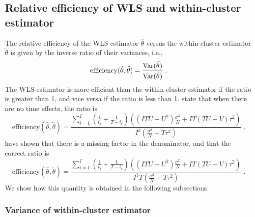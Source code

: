 \documentclass[10pt]{article}
\begin{document}
\subsection{Relative efficiency of WLS and within-cluster estimator} \label{apx:efficiency}

The relative efficiency of the WLS estimator $\hat{\theta}$ versus the within-cluster estimator $\tilde{\theta}$ is given by the inverse ratio of their variances, i.e.,
\[
\mathrm{efficiency}(\hat{\theta},\tilde{\theta}) = \frac{\mathrm{Var}(\tilde{\theta})}{\mathrm{Var}(\hat{\theta})} \;.
\]
The WLS estimator is more efficient than the within-cluster estimator if the ratio is greater than 1, and vice versa if the ratio is less than 1. \textcite{Hussey:2007} state that when there are no time effects, the ratio is
\[
\mathrm{efficiency}(\hat{\theta},\tilde{\theta}) = \frac{\sum_{i=1}^I\left(\frac{1}{t_i}+\frac{1}{T-t_i}\right)\left((ITU-U^2)\frac{\sigma^2}{N}+IT(TU-V)\tau^2\right)}{I^3\left(\frac{\sigma^2}{N}+T\tau^2\right)} \;.
\]
\textcite{Liao:2015} have shown that there is a missing factor in the denominator, and that the correct ratio is
\[
\mathrm{efficiency}(\hat{\theta},\tilde{\theta}) = \frac{\sum_{i=1}^I\left(\frac{1}{t_i}+\frac{1}{T-t_i}\right)\left((ITU-U^2)\frac{\sigma^2}{N}+IT(TU-V)\tau^2\right)}{I^3T\left(\frac{\sigma^2}{N}+T\tau^2\right)} \;.
\]
We show how this quantity is obtained in the following subsections.

\iffalse
Note: $\Var(\hat{\theta})$ is not the one given above as it is assumed there are no time effects.
\begin{align*}
\mathrm{efficacy}(\hat{\theta},\tilde{\theta}) &= \frac{\Var(\tilde{\theta})}{\Var(\hat{\theta})} \\
&= \frac{\left(\frac{\sigma^2}{NI^2}\sum_i\left(\frac{1}{t_i}+\frac{1}{T-t_i}\right)\right)}{\left(\frac{I\sigma^2\left(\frac{\sigma^2}{N}+T\tau^2\right)}{(IU-W)\sigma^2+N(U^2+ITU-TW-IV)\tau^2}\right)} \\
&= \frac{\sum_i\left(\frac{1}{t_i}+\frac{1}{T-t_i}\right)\left((IU-W)\sigma^2+N(U^2+ITU-TW-IV)\tau^2\right)}{NI^3\left(\frac{\sigma^2}{N}+T\tau^2\right)} \\
&= \frac{\sum_i\left(\frac{1}{t_i}+\frac{1}{T-t_i}\right)\left((IU-W)\frac{\sigma^2}{N}+(U^2+ITU-TW-IV)\tau^2\right)}{I^3\left(\frac{\sigma^2}{N}+T\tau^2\right)} 
\end{align*}
\fi

\subsubsection{Variance of within-cluster estimator}
\end{document}
